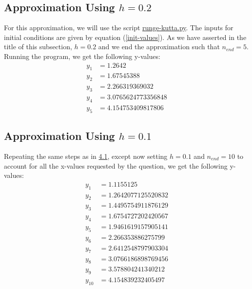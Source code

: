 \documentclass{article}
\begin{document}
\subsection{Approximation Using $h=0.2$}
\label{sec:4.1}
For this approximation, we will use the script \href{https://github.com/colinmc513/approximation-scripts/blob/main/runge-kutta.py}{runge-kutta.py}. The inputs for initial conditions are given by equation (\ref{init-values}). As we have asserted in the title of this subsection, $h=0.2$ and we end the approximation such that $n_{end}=5$. Running the program, we get the following y-values:
\begin{equation*}
    \begin{split}
        y_1 &= 1.2642 \\
        y_2 &= 1.67545388 \\
        y_3 &= 2.266319369032 \\
        y_4 &= 3.0765624773356848 \\
        y_5 &= 4.154753409817806 
    \end{split}
\end{equation*}
\subsection{Approximation Using $h = 0.1$}
Repeating the same steps as in \hyperref[sec:4.1]{4.1}, except now setting $h = 0.1$ and $n_{end}=10$ to account for all the x-values requested by the question, we get the following y-values:
\begin{equation*}
    \begin{split}
        y_1 &= 1.1155125 \\
        y_2 &= 1.2642077125520832 \\
        y_3 &= 1.4495754911876129 \\
        y_4 &= 1.6754727202420567 \\
        y_5 &= 1.9461619157905141 \\
        y_6 &= 2.266353886275799 \\
        y_7 &= 2.6412548797903304 \\
        y_8 &= 3.0766186898769456 \\
        y_9 &= 3.578804241340212 \\
        y_{10} &= 4.154839232405497 
    \end{split}
\end{equation*}
\end{document}
